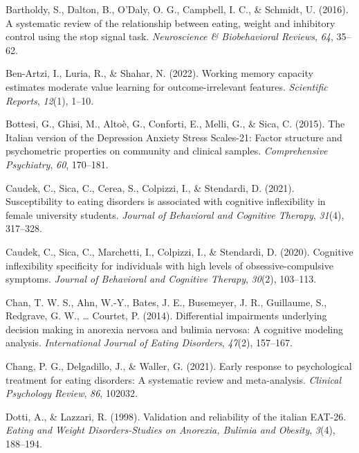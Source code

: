 \documentclass[
  man,floatsintext]{apa6}
\newlength{\cslhangindent}
\newlength{\cslentryspacingunit} %
\newenvironment{CSLReferences}[2] %
 {%
  \setlength{\parindent}{0pt}
  \ifodd #1
  \let\oldpar\par
  \def\par{\hangindent=\cslhangindent\oldpar}
  \fi
  \setlength{\parskip}{#2\cslentryspacingunit}
 }%
 {}
\begin{document}
\hypertarget{refs}{}
\begin{CSLReferences}{1}{0}
\leavevmode{}%
Bartholdy, S., Dalton, B., O'Daly, O. G., Campbell, I. C., \& Schmidt, U. (2016). A systematic review of the relationship between eating, weight and inhibitory control using the stop signal task. \emph{Neuroscience \& Biobehavioral Reviews}, \emph{64}, 35--62.

\leavevmode{}%
Ben-Artzi, I., Luria, R., \& Shahar, N. (2022). Working memory capacity estimates moderate value learning for outcome-irrelevant features. \emph{Scientific Reports}, \emph{12}(1), 1--10.

\leavevmode{}%
Bottesi, G., Ghisi, M., Altoè, G., Conforti, E., Melli, G., \& Sica, C. (2015). {The Italian version of the Depression Anxiety Stress Scales-21: Factor structure and psychometric properties on community and clinical samples}. \emph{Comprehensive Psychiatry}, \emph{60}, 170--181.

\leavevmode{}%
Caudek, C., Sica, C., Cerea, S., Colpizzi, I., \& Stendardi, D. (2021). Susceptibility to eating disorders is associated with cognitive inflexibility in female university students. \emph{Journal of Behavioral and Cognitive Therapy}, \emph{31}(4), 317--328.

\leavevmode{}%
Caudek, C., Sica, C., Marchetti, I., Colpizzi, I., \& Stendardi, D. (2020). Cognitive inflexibility specificity for individuals with high levels of obsessive-compulsive symptoms. \emph{Journal of Behavioral and Cognitive Therapy}, \emph{30}(2), 103--113.

\leavevmode{}%
Chan, T. W. S., Ahn, W.-Y., Bates, J. E., Busemeyer, J. R., Guillaume, S., Redgrave, G. W., \ldots{} Courtet, P. (2014). Differential impairments underlying decision making in anorexia nervosa and bulimia nervosa: A cognitive modeling analysis. \emph{International Journal of Eating Disorders}, \emph{47}(2), 157--167.

\leavevmode{}%
Chang, P. G., Delgadillo, J., \& Waller, G. (2021). Early response to psychological treatment for eating disorders: A systematic review and meta-analysis. \emph{Clinical Psychology Review}, \emph{86}, 102032.

\leavevmode{}%
Dotti, A., \& Lazzari, R. (1998). Validation and reliability of the italian {EAT-26}. \emph{Eating and Weight Disorders-Studies on Anorexia, Bulimia and Obesity}, \emph{3}(4), 188--194.


\end{CSLReferences}
\end{document}
